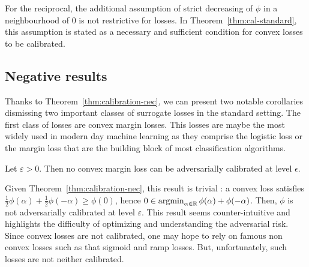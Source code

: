 

\begin{rmq} 




For the reciprocal, the additional assumption of strict decreasing of $\phi$ in a neighbourhood of $0$ is not restrictive for losses. In Theorem~\ref{thm:cal-standard}, this assumption is stated as a necessary and sufficient condition for convex losses to be calibrated.
\end{rmq}





\subsection{Negative results}

Thanks to Theorem~\ref{thm:calibration-nec}, we can present two notable corollaries dismissing two important classes of surrogate losses in the standard setting. The first class of losses are convex margin losses. This losses are maybe the most widely used in modern day machine learning as they comprise the logistic loss or the margin loss that are the building block of most classification algorithms. %

\begin{coro} Let $\varepsilon>0$. Then no convex margin loss can be adversarially calibrated at level $\epsilon$.
\end{coro} 


Given Theorem~\ref{thm:calibration-nec}, this result is trivial : a convex loss satisfies $\frac12\phi(\alpha)+\frac12\phi(-\alpha)\geq \phi(0)$, hence $0\in \operatorname*{argmin}_{\alpha\in\mathbb{R}}
\phi(\alpha)+\phi(-\alpha)$.  Then, $\phi$ is not adversarially calibrated at level $\varepsilon$. This result seems counter-intuitive and highlights the difficulty of optimizing and understanding the adversarial risk. Since  convex losses are not calibrated, one may hope to rely on  famous non convex losses such as that sigmoid and ramp losses. But, unfortunately, such losses are not neither calibrated.




